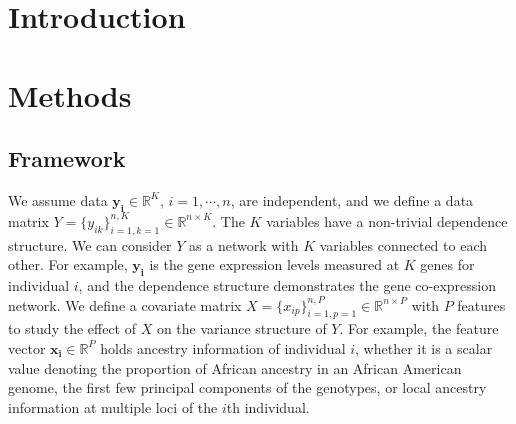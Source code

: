 \documentclass[12pt]{extarticle}
\theoremstyle{theorem}
\begin{document}
\section{Introduction}



	
\section{Methods}
\subsection{Framework}
We assume data $\bm{y_i} \in \mathbb{R}^{K}$, $i = 1, \cdots, n$, are independent, and we define a data matrix $Y = \{y_{ik}\}_{i = 1, k = 1}^{n, K} \in \mathbb{R}^{n \times K}$. The $K$ variables have a non-trivial dependence structure. We can consider $Y$ as a network with $K$ variables connected to each other. For example, $\bm{y_i}$ is the gene expression levels measured at $K$ genes for individual $i$, and the dependence structure demonstrates the gene co-expression network. We define a covariate matrix $X =\{x_{ip}\}_{i=1,p=1}^{n,P} \in \mathbb{R}^{n \times P}$ with $P$ features to study the effect of $X$ on the variance structure of $Y$. For example, the feature vector $\bm{x_i} \in \mathbb{R}^{P}$ holds ancestry information of individual $i$, whether it is a scalar value denoting the proportion of African ancestry in an African American genome, the first few principal components of the genotypes, or local ancestry information at multiple loci of the $i$th individual.  
\end{document}
